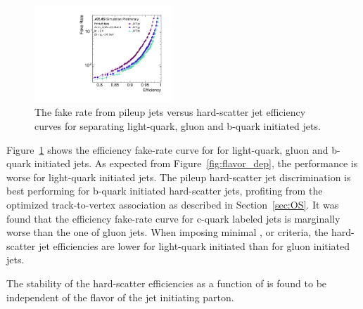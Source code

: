 \documentclass{atlasnote}
\begin{document}
\begin{figure}[!htbp]
  \centering
  \includegraphics[width= 0.46\textwidth]{ROC_JVT_q_vs_g_vs_b}
  \caption{The fake rate from pileup jets versus hard-scatter jet efficiency curves for \JVT separating light-quark, gluon and b-quark initiated jets.}
  \label{fig:ROC_q_vs_g_vs_b}
\end{figure}
Figure~\ref{fig:ROC_q_vs_g_vs_b} shows the efficiency \vs fake-rate curve for \JVT for light-quark, gluon and b-quark initiated jets. 
As expected from Figure~\ref{fig:flavor_dep}, the performance is worse for light-quark initiated jets. The pileup \vs hard-scatter jet discrimination
is best performing for b-quark initiated hard-scatter jets, profiting from the optimized track-to-vertex association as described in Section~\ref{sec:OS}.
It was found that the efficiency \vs fake-rate curve for c-quark labeled jets is marginally worse than the one of gluon jets. 
When imposing minimal \cJVF, \RpT or \JVT criteria, the hard-scatter jet efficiencies are lower for light-quark initiated than for gluon initiated jets.

The stability 
of the hard-scatter efficiencies as a function of \NPV is found to be independent of the flavor of the jet initiating parton. 


\end{document}
